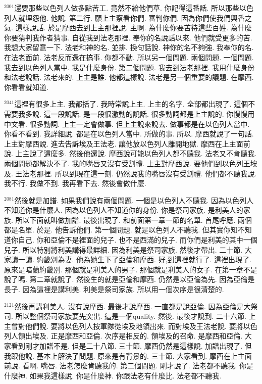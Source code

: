 \documentclass{book}
\begin{document}
$^{2001}$還要那些以色列人做多點苦工.
竟然不給他們草.
你記得這番話.
所以那些以色列人就埋怨他.
他說.
第二行.
願上主察看你們.
審判你們.
因為你們使我們興香之氣.
這樣說話.
於是摩西去到上主那裡說.
主啊.
為什麼你要苦待這些百姓.
為什麼你要猜判我作者猜事.
自從我到法老那裡.
奉你的名說話以來.
他們就受更多的苦.
我想大家留意一下.
法老和神的名.
並排.
換句話說.
神你的名不夠強.
我奉你的名.
在法老面前.
法老反而還在搞事.
你都不動.
所以另一個問題.
兩個問題.
一個問題.
我去到以色列人當中.
我是什麼身份.
第二個問題.
我去到法老那裡.
我用什麼身份和法老說話.
法老來的.
上主是誰.
他都這樣說.
法老是另一個重要的議題.
在摩西.
你看看就知道.

$^{2041}$這裡有很多上主.
我都括了.
我時常說上主.
上主的名字.
全部都出現了.
這個不需要我多說.
這一段說話.
是一段很激動的說話.
很多動詞都是上主說的.
你慢慢用中文看.
很多動詞.
上主一定會做事.
但上主說來說去.
做事都是在以色列人當中.
你看不看到.
我詳細說.
都是在以色列人當中.
所做的事.
所以.
摩西就說了一句話.
上主對摩西說.
進去告訴埃及王法老.
讓他放以色列人離開地獄.
摩西在上主面前說.
上主說了這麼多.
然後他還說.
摩西說可能以色列人都不聽我.
法老又不肯聽我.
兩個問題都解決不了.
我的嘴唇又沒有受割禮.
上主對摩西說.
要他們到以色列王埃及.
王法老那裡.
所以到現在這一刻.
仍然說我的嘴唇沒有受割禮.
他們都不聽我說.
我不行.
我做不到.
我再看下去.
然後會做什麼.

$^{2081}$然後就是加譜.
如果我們說有兩個問題.
一個是以色列人不聽我.
因為以色列人不知道你是什麼人.
因為以色列人不知道你的身份.
你是祭司家族.
是利美人的家族.
所以下面就叫做加譜.
最後出現了.
和前面第一章一節的名單.
首尾呼應.
兩個都是名單.
於是.
他告訴他們.
第一個問題.
就是以色列人不聽我.
但其實你知不知道你自己.
你和亞倫不是裡面的兒子.
也不是西滿的兒子.
而你們是利美的其中一個兒子.
所以特別將利美講得最詳細.
因為利美是祭司家族.
然後才帶出.
二十節.
大家讀一讀.
約畿別為妻.
他為她生下了亞倫和摩西.
好,到這裡就行了.
這裡出現了.
原來是暗蘭約畿別.
那個就是利美人的男子.
那個就是利美人的女子.
在第一章不是說了嗎.
第二章就說了.
然後生的就是亞倫和摩西.
仍然是以亞倫為先.
因為亞倫是長子.
因為這裡是講利美.
利美是祭司家族.
所以用一個次序是很清楚的.

$^{2121}$然後再講利美人.
沒有說摩西.
最後才說摩西.
一直都是說亞倫.
因為亞倫是大祭司.
所以整個祭司家族要先突出.
這是一個quality.
然後.
最後才說到.
二十六節.
上主曾對他們說.
要將以色列人按軍隊從埃及地領出來.
而對埃及王法老說.
要將以色列人領出埃及.
正是摩西和亞倫.
次序是相反的.
領埃及的召命.
是摩西和亞倫.
大家看到剛才加譜不是.
但是二十八節.
三十節.
摩西仍然是這樣說.
加譜出現了.
但我跟他說.
基本上解決了問題.
原來是有背景的.
三十節.
大家看到.
摩西在上主面前說.
看啊.
嘴唇.
法老怎麼肯聽我的.
第二個問題.
剛才說了.
法老都不聽我.
你是什麼神.
如果我這樣說.
你是什麼神.
你跟法老有什麼比.
法老都不聽我.
\end{document}
